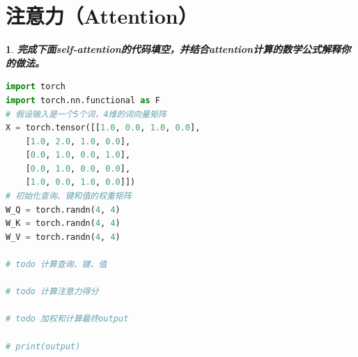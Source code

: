 \documentclass{article}
\theoremstyle{Problem}
\newtheorem{prob}[subsection]{}
\theoremstyle{Solution}
\begin{document}
	\section{注意力（Attention）}
	
	\begin{prob}
		\textbf{完成下面self-attention的代码填空，并结合attention计算的数学公式解释你的做法。}\\
		\begin{lstlisting}[language=python, style = mystyle]
import torch
import torch.nn.functional as F
# 假设输入是一个5个词，4维的词向量矩阵
X = torch.tensor([[1.0, 0.0, 1.0, 0.0],
	[1.0, 2.0, 1.0, 0.0],
	[0.0, 1.0, 0.0, 1.0],
	[0.0, 1.0, 0.0, 0.0],
	[1.0, 0.0, 1.0, 0.0]])
# 初始化查询、键和值的权重矩阵
W_Q = torch.randn(4, 4)  
W_K = torch.randn(4, 4)
W_V = torch.randn(4, 4)

# todo 计算查询、键、值

# todo 计算注意力得分

# todo 加权和计算最终output

# print(output)
		\end{lstlisting}
	\end{prob}
	
\end{document}
